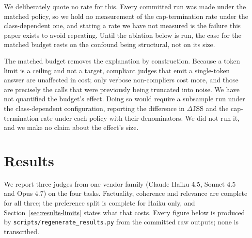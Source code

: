 \documentclass[11pt]{article}          %
\begin{document}
We deliberately quote no rate for this. Every committed run was made under the
matched policy, so we hold no measurement of the cap-termination rate under the
class-dependent one, and stating a rate we have not measured is the failure this
paper exists to avoid repeating. Until the ablation below is run, the case for
the matched budget rests on the confound being structural, not on its size.

The matched budget removes the explanation by construction. Because a token
limit is a ceiling and not a target, compliant judges that emit a single-token
answer are unaffected in cost; only verbose non-compliers cost more, and those
are precisely the calls that were previously being truncated into noise. We
have not quantified the budget's effect. Doing so would require a subsample run
under the class-dependent configuration, reporting the difference in
$\Delta\mathrm{JSS}$ and the cap-termination rate under each policy with their
denominators. We did not run it, and we make no claim about the effect's size.
\section{Results}
\label{sec:results}

We report three judges from one vendor family (Claude Haiku 4.5, Sonnet 4.5 and
Opus 4.7) on the four tasks. Factuality, coherence and relevance are
complete for all three; the preference split is complete for Haiku only, and
Section~\ref{sec:results-limits} states what that costs. Every figure below is
produced by \texttt{scripts/regenerate\_results.py} from the committed raw
outputs; none is transcribed.
\end{document}
